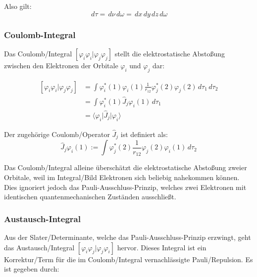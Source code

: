 Also gilt:
\begin{equation*}
    \,d\tau = \,d\nu \,d\omega = \,dx \,dy \,dz \,d\omega
\end{equation*}

\cite[S. 19]{tc2_3}

\subsubsection*{Coulomb-Integral}
Das Coulomb\-/Integral $\left[ \varphi_i \varphi_i \vert \varphi_j\varphi_j \right]$
stellt die elektrostatische Abstoßung zwischen den Elektronen der Orbitale $\varphi_i$ und $\varphi_j$ dar:

\begin{equation}\label{coulomb}
\begin{aligned}
  \left[ \varphi_i \varphi_i \vert \varphi_j \varphi_j \right] &= 
  \int \varphi_i^*(1) \varphi_i(1) \frac{1}{r_{12}} \varphi_j^*(2) \varphi_j(2) \,d\tau_1 \,d\tau_2\\
  &= \int \varphi_i^*(1) \hat{J}_j \varphi_i(1) \,d\tau_1 \\ 
  &= \langle \varphi_i \vert \hat{J}_j \vert \varphi_i \rangle
\end{aligned}
\end{equation}

Der zugehörige Coulomb\-/Operator $\hat{J}_j$ ist definiert als:
\begin{equation}\label{coulomb-operator}
  \hat{J}_j \varphi_i(1):= 
  \int \varphi_j^*(2) \frac{1}{r_{12}} \varphi_j(2) \varphi_i(1) \,d\tau_2 
\end{equation}

Das Coulomb\-/Integral alleine überschätzt die elektrostatische Abstoßung zweier Orbitale,
weil im Integral\-/Bild Elektronen sich beliebig nahekommen können.
Dies ignoriert jedoch das Pauli-Ausschluss-Prinzip, 
welches zwei Elektronen mit identischen quantenmechanischen Zuständen ausschließt.

\cite[S. 206]{lewars_2016} \cite[S. 23]{tc2_3}

\subsubsection*{Austausch-Integral}
Aus der Slater\-/Determinante, welche das Pauli-Ausschluss-Prinzip erzwingt,
geht das Austausch\-/Integral $\left[ \varphi_i \varphi_j \vert \varphi_j\varphi_i \right]$ hervor.
Dieses Integral ist ein Korrektur\-/Term für die im Coulomb\-/Integral vernachlässigte Pauli\-/Repulsion.
Es ist gegeben durch:

